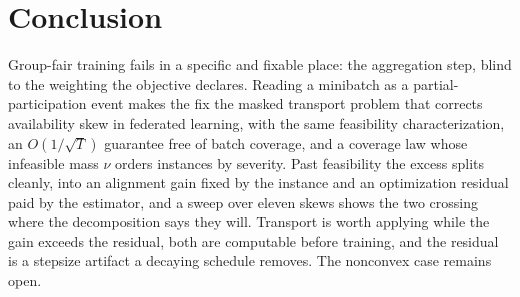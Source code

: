 \documentclass{article}
\theoremstyle{definition}
\begin{document}


\section{Conclusion}

Group-fair training fails in a specific and fixable place: the aggregation step,
blind to the weighting the objective declares. Reading a minibatch as a
partial-participation event makes the fix the masked transport problem that
corrects availability skew in federated learning, with the same feasibility
characterization, an $O(1/\sqrt{T})$ guarantee free of batch coverage, and a
coverage law whose infeasible mass $\nu$ orders instances by severity. Past
feasibility the excess splits cleanly, into an alignment gain fixed by the
instance and an optimization residual paid by the estimator, and a sweep over
eleven skews shows the two crossing where the decomposition says they will. Transport is
worth applying while the gain exceeds the residual, both are computable before
training, and the residual is a stepsize artifact a decaying schedule removes.
The nonconvex case remains open.

\clearpage
\renewcommand{\refname}{REFERENCES}
\end{document}
